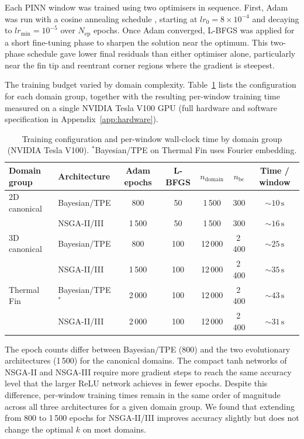 Each PINN window was trained using two optimisers in sequence.
First, Adam \cite{kingma2015} was run with a cosine annealing schedule
\cite{loshchilov2017}, starting at $lr_0 = 8\times10^{-4}$ and decaying to
$lr_\mathrm{min} = 10^{-5}$ over $N_\mathrm{ep}$ epochs.
Once Adam converged, L-BFGS \cite{liu1989} was applied for a short
fine-tuning phase to sharpen the solution near the optimum.
This two-phase schedule gave lower final residuals than either optimiser
alone, particularly near the fin tip and reentrant corner regions where the
gradient is steepest.

The training budget varied by domain complexity.
Table~\ref{tab:training_budget} lists the configuration for each domain
group, together with the resulting per-window training time measured on a
single NVIDIA Tesla V100 GPU (full hardware and software specification in
Appendix~\ref{app:hardware}).

\begin{table}[H]
\centering
\caption{Training configuration and per-window wall-clock time by domain group
(NVIDIA Tesla V100). $^*$Bayesian/TPE on Thermal Fin uses Fourier embedding.}
\label{tab:training_budget}
\small
\begin{tabular}{llccccc}
\toprule
Domain group & Architecture & Adam epochs & L-BFGS & $n_\mathrm{domain}$ & $n_\mathrm{bc}$ &
  Time / window \\
\midrule
2D canonical  & Bayesian/TPE   &   800 &  50 & 1\,500 &   300 & $\sim 10\,\mathrm{s}$ \\
              & NSGA-II/III    & 1\,500 &  50 & 1\,500 &   300 & $\sim 16\,\mathrm{s}$ \\
\midrule
3D canonical  & Bayesian/TPE   &   800 & 100 & 12\,000 & 2\,400 & $\sim 25\,\mathrm{s}$ \\
              & NSGA-II/III    & 1\,500 & 100 & 12\,000 & 2\,400 & $\sim 35\,\mathrm{s}$ \\
\midrule
Thermal Fin   & Bayesian/TPE$^*$ & 2\,000 & 100 & 12\,000 & 2\,400 & $\sim 43\,\mathrm{s}$ \\
              & NSGA-II/III      & 2\,000 & 100 & 12\,000 & 2\,400 & $\sim 31\,\mathrm{s}$ \\
\bottomrule
\end{tabular}
\end{table}

The epoch counts differ between Bayesian/TPE (800) and the two evolutionary
architectures (1\,500) for the canonical domains.
The compact tanh networks of NSGA-II and NSGA-III require more gradient steps
to reach the same accuracy level that the larger ReLU network achieves in
fewer epochs.
Despite this difference, per-window training times remain in the same order of
magnitude across all three architectures for a given domain group.
We found that extending from 800 to 1\,500 epochs for NSGA-II/III improves
accuracy slightly but does not change the optimal $k$ on most domains.

